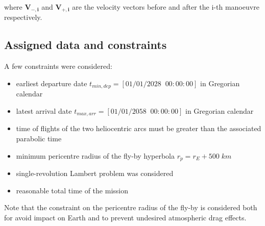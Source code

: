 where $\boldsymbol{V_{-,i}}$ and $\boldsymbol{V_{+,i}}$ are the velocity vectors before and after the i-th manoeuvre respectively.

\subsection{Assigned data and constraints}
\label{subsec:data_constraints}

A few constraints were considered:

\begin{itemize}
    [wide,itemsep=3pt,topsep=3pt]
    \item earliest departure date $t_{min,dep} = \left[01/01/2028 \;\; 00:00:00\right]$ in Gregorian calendar
    \item latest arrival date $t_{max,arr} = \left[01/01/2058 \;\; 00:00:00\right]$ in Gregorian calendar
    \item time of flights of the two heliocentric arcs must be greater than the associated parabolic time
    \item minimum pericentre radius of the fly-by hyperbola $r_p = r_E + 500 \; km$
    \item single-revolution Lambert problem was considered
    \item reasonable total time of the mission
\end{itemize}

Note that the constraint on the pericentre radius of the fly-by is considered both for avoid impact on Earth and to prevent undesired atmospheric drag effects.